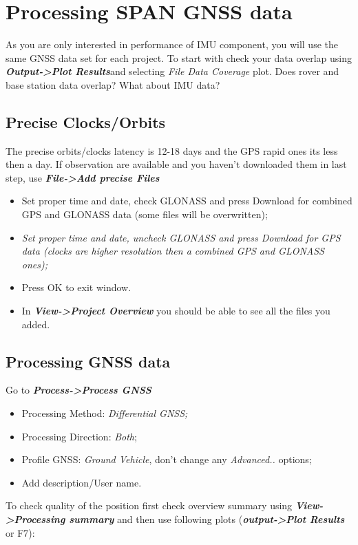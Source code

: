 \documentclass[british,DIV=calc, paper=a4, fontsize=12pt, onecolumn]{scrartcl}
\begin{document}
\section{Processing SPAN GNSS data}\label{sec:Processing-GNSS-data}

As you are only interested in performance of IMU component, you will use the same GNSS data set for each project. To start with check your data overlap using \textbf{\emph{Output->Plot Results}}and selecting\emph{ File Data Coverage }plot. Does rover and base station data overlap? What about IMU data?

\subsection{Precise Clocks/Orbits}
The precise orbits/clocks latency is 12-18 days and the GPS rapid ones its less then a day. If observation are available and you haven't downloaded them in last step, use \textbf{\emph{File->Add precise Files}} 
\begin{itemize}
	\item Set proper time and date, check GLONASS and press Download for combined GPS and GLONASS data (some files will be overwritten);
	\item \emph{Set proper time and date, uncheck GLONASS and press Download for GPS data (clocks are higher resolution then a combined GPS and
	GLONASS ones);}
	\item Press OK to exit window.
	\item In \textbf{\emph{View->Project Overview}} you should be able to see all the files you added.
\end{itemize}

\subsection{Processing GNSS data}

Go to\emph{ }\textbf{\emph{Process->Process GNSS}}
\begin{itemize}
	\item Processing Method: \emph{Differential GNSS;}
	\item Processing Direction: \emph{Both};
	\item Profile GNSS: \emph{Ground Vehicle}, don't change any \emph{Advanced..}
	options;
	\item Add description/User name.
\end{itemize}

To check quality of the position first check overview summary using \textbf{\emph{View->Processing summary}} and then use following plots (\textbf{\emph{output->Plot Results}} or F7): 
\end{document}
